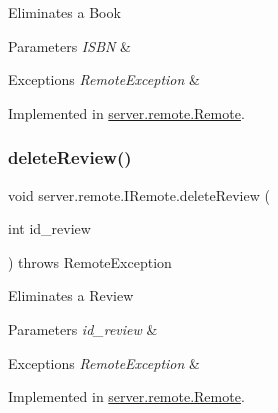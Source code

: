 Eliminates a Book 
\begin{DoxyParams}{Parameters}
{\em I\+S\+BN} & \\
\hline
\end{DoxyParams}

\begin{DoxyExceptions}{Exceptions}
{\em Remote\+Exception} & \\
\hline
\end{DoxyExceptions}


Implemented in \hyperlink{classserver_1_1remote_1_1_remote_a013ab36d40de824c6ad7a48f59d12684}{server.\+remote.\+Remote}.

\mbox{\label{interfaceserver_1_1remote_1_1_i_remote_a2bcc3db515d7b6f420449bcf6367298c}} 
\subsubsection{\texorpdfstring{delete\+Review()}{deleteReview()}}
{\footnotesize\ttfamily void server.\+remote.\+I\+Remote.\+delete\+Review (\begin{DoxyParamCaption}\item[{int}]{id\+\_\+review }\end{DoxyParamCaption}) throws Remote\+Exception}

Eliminates a Review 
\begin{DoxyParams}{Parameters}
{\em id\+\_\+review} & \\
\hline
\end{DoxyParams}

\begin{DoxyExceptions}{Exceptions}
{\em Remote\+Exception} & \\
\hline
\end{DoxyExceptions}


Implemented in \hyperlink{classserver_1_1remote_1_1_remote_ab80b5addc446fe5f1ecf9a522794ff4f}{server.\+remote.\+Remote}.

\mbox{\label{interfaceserver_1_1remote_1_1_i_remote_a017e07cb93ae582188c20d7b1ce6b014}} 
